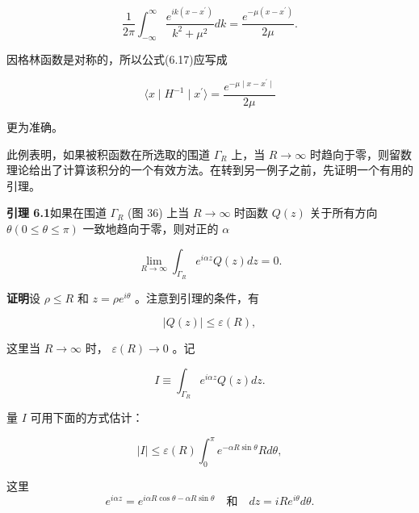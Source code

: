\begin{equation*}
\frac {1}{2 \pi} \int_ {- \infty} ^ {\infty} \frac {e ^ {i k \left(x - x ^ {\prime}\right)}}{k ^ {2} + \mu^ {2}} d k = \frac {e ^ {- \mu \left(x - x ^ {\prime}\right)}}{2 \mu}.\tag{6.17}
\end{equation*}

因格林函数是对称的，所以公式(6.17)应写成

\begin{equation*}
\langle x \mid H ^ {- 1} \mid x ^ {\prime} \rangle = \frac {e ^ {- \mu \mid x - x ^ {\prime} \mid}}{2 \mu}\tag{6.18}
\end{equation*}

更为准确。

此例表明，如果被积函数在所选取的围道 $\Gamma_{R}$ 上，当 $R \to \infty$ 时趋向于零，则留数理论给出了计算该积分的一个有效方法。在转到另一例子之前，先证明一个有用的引理。

\textbf{引理 6.1}\quad [约当(Jordan)] 如果在围道 $\Gamma_{R}$ (图 36) 上当 $R \to \infty$ 时函数 $Q(z)$ 关于所有方向 $\theta(0 \leqslant \theta \leqslant \pi)$ 一致地趋向于零，则对正的 $\alpha$

\begin{equation*}
\lim _ {R \rightarrow \infty} \int_ {\Gamma_ {R}} e ^ {i \alpha z} Q (z) d z = 0.
\end{equation*}

\textbf{证明}\quad 设 $\rho \leqslant R$ 和 $z = \rho e^{i\theta}$ 。注意到引理的条件，有

\begin{equation*}
\mid Q (z) \mid \leqslant \varepsilon (R),
\end{equation*}

这里当 $R \to \infty$ 时， $\varepsilon(R) \to 0$ 。记

\begin{equation*}
I \equiv \int_ {\Gamma_ {R}} e ^ {i \alpha z} Q (z) d z.
\end{equation*}

量 $I$ 可用下面的方式估计：

\begin{equation*}
\mid I \mid \leqslant \varepsilon (R) \int_ {0} ^ {\pi} e ^ {- \alpha R \sin \theta} R d \theta ,\tag{6.19}
\end{equation*}

这里
\begin{equation*}
e ^ {i \alpha z} = e ^ {i \alpha R \cos \theta - \alpha R \sin \theta} \quad \text {和} \quad d z = i R e ^ {i \theta} d \theta .
\end{equation*}


